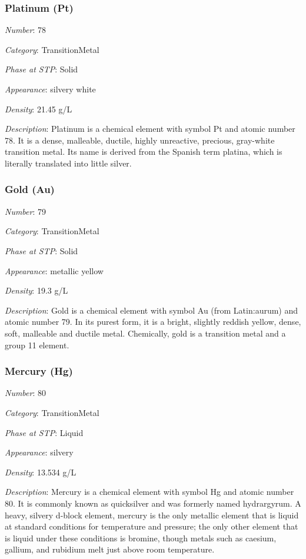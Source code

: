 \documentclass{article}
\begin{document}
\hypertarget{subsubsection::Pt}{}\subsubsection{Platinum (Pt)}

\textit{Number}: 78

\textit{Category}: TransitionMetal

\textit{Phase at STP}: Solid

\textit{Appearance}: silvery white

\textit{Density}: 21.45 g/L

\textit{Description}: Platinum is a chemical element with symbol Pt and atomic number 78. It is a dense, malleable, ductile, highly unreactive, precious, gray-white transition metal. Its name is derived from the Spanish term platina, which is literally translated into little silver.

\hypertarget{subsubsection::Au}{}\subsubsection{Gold (Au)}

\textit{Number}: 79

\textit{Category}: TransitionMetal

\textit{Phase at STP}: Solid

\textit{Appearance}: metallic yellow

\textit{Density}: 19.3 g/L

\textit{Description}: Gold is a chemical element with symbol Au (from Latin:aurum) and atomic number 79. In its purest form, it is a bright, slightly reddish yellow, dense, soft, malleable and ductile metal. Chemically, gold is a transition metal and a group 11 element.

\hypertarget{subsubsection::Hg}{}\subsubsection{Mercury (Hg)}

\textit{Number}: 80

\textit{Category}: TransitionMetal

\textit{Phase at STP}: Liquid

\textit{Appearance}: silvery

\textit{Density}: 13.534 g/L

\textit{Description}: Mercury is a chemical element with symbol Hg and atomic number 80. It is commonly known as quicksilver and was formerly named hydrargyrum. A heavy, silvery d-block element, mercury is the only metallic element that is liquid at standard conditions for temperature and pressure; the only other element that is liquid under these conditions is bromine, though metals such as caesium, gallium, and rubidium melt just above room temperature.
\end{document}

